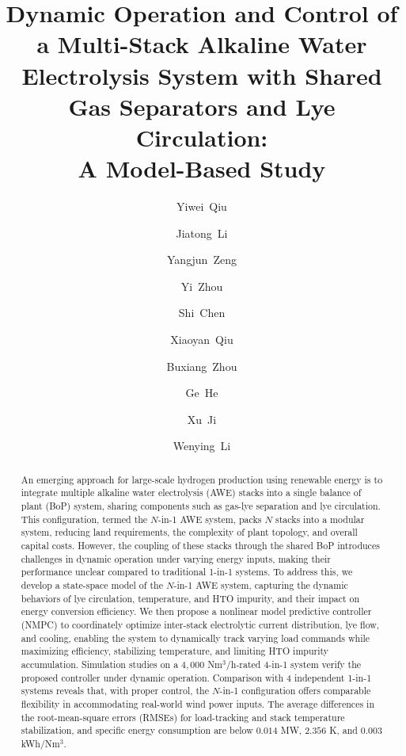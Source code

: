\documentclass[review,3p,10pt]{elsarticle}
\begin{document}
\begin{frontmatter}

\title{Dynamic Operation and Control
	of a Multi-Stack Alkaline Water
	 Electrolysis System with Shared Gas Separators and Lye Circulation:\\ A Model-Based Study}


\author[label1]{Yiwei~Qiu}
\author[label1]{Jiatong~Li}
\author[label1]{Yangjun~Zeng}
\author[label1]{Yi~Zhou}
\author[label1]{Shi~Chen}
\author[label1]{Xiaoyan~Qiu}
\author[label1]{Buxiang~Zhou}
\author[label2]{Ge~He}
\author[label2]{Xu~Ji}
\author[label3]{Wenying~Li}

\address[label1]{College of Electrical Engineering, Sichuan University, Chengdu, 610065, China}
\address[label2]{School of Chemical Engineering, Sichuan University, Chengdu, 610065, China}
\address[label3]{Sichuan Tsinghua Energy Internet Research Institute, Chengdu, 610213, China}

\begin{abstract}
   An emerging approach for large-scale hydrogen production using renewable energy is to integrate multiple alkaline water electrolysis (AWE) stacks into a single balance of plant (BoP) system, sharing components such as gas-lye separation and lye circulation. This configuration, termed the $N$-in-1 AWE system, packs $N$ stacks into a modular system, reducing land requirements, the complexity of plant topology, and overall capital costs. However, the coupling of these stacks through the shared BoP introduces challenges in dynamic operation under varying energy inputs, making their performance unclear compared to traditional 1-in-1 systems. To address this, we develop a state-space model of the $N$-in-1 AWE system, capturing the dynamic behaviors of lye circulation, temperature, and HTO impurity, and their impact on energy conversion efficiency. We then propose a nonlinear model predictive controller (NMPC) to coordinately optimize inter-stack electrolytic current distribution, lye flow, and cooling, enabling the system to dynamically track varying load commands while maximizing efficiency, stabilizing temperature, and limiting HTO impurity accumulation. Simulation studies on a $4,000$ Nm$^3$/h-rated 4-in-1 system verify the proposed controller under dynamic operation. Comparison with 4 independent 1-in-1 systems reveals that, with proper control, the $N$-in-1 configuration offers comparable flexibility in accommodating real-world wind power inputs. The average differences in the root-mean-square errors (RMSEs) for load-tracking and stack temperature stabilization, and specific energy consumption are below $0.014$ MW, $2.356$ K, and $0.003$ kWh/Nm$^3$.
\end{abstract}


\end{frontmatter}
\end{document}
